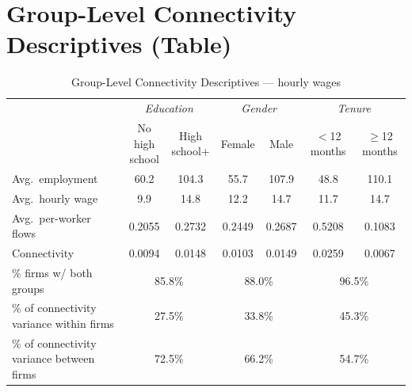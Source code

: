\documentclass[11pt]{article}
\begin{document}
\section{Group-Level Connectivity Descriptives (Table)}
\begin{table}[H]
  \centering
  \caption{Group-Level Connectivity Descriptives --- hourly wages}
  \footnotesize
  \begin{tabular}{lcccccc}
    \toprule\toprule
     & \multicolumn{2}{c}{\textit{Education}} & \multicolumn{2}{c}{\textit{Gender}} & \multicolumn{2}{c}{\textit{Tenure}} \\
    \cmidrule(lr){2-3} \cmidrule(lr){4-5} \cmidrule(lr){6-7}
     & \shortstack{No high\\school} & \shortstack{High\\school+} & Female & Male
     & \shortstack{$<$12\\months} & \shortstack{$\geq$12\\months} \\
    \midrule
    \quad Avg.\ employment & 60.2 & 104.3 & 55.7 & 107.9 & 48.8 & 110.1 \\
    \quad Avg.\ hourly wage & 9.9 & 14.8 & 12.2 & 14.7 & 11.7 & 14.7 \\
    \quad Avg.\ per-worker flows & 0.2055 & 0.2732 & 0.2449 & 0.2687 & 0.5208 & 0.1083 \\
    \quad Connectivity & 0.0094 & 0.0148 & 0.0103 & 0.0149 & 0.0259 & 0.0067 \\
    \midrule
    \quad \% firms w/ both groups & \multicolumn{2}{c}{85.8\%} & \multicolumn{2}{c}{88.0\%} & \multicolumn{2}{c}{96.5\%} \\
    \quad \% of connectivity variance within firms & \multicolumn{2}{c}{27.5\%} & \multicolumn{2}{c}{33.8\%} & \multicolumn{2}{c}{45.3\%} \\
    \quad \% of connectivity variance between firms & \multicolumn{2}{c}{72.5\%} & \multicolumn{2}{c}{66.2\%} & \multicolumn{2}{c}{54.7\%} \\
    \bottomrule\bottomrule
  \end{tabular}
  \begin{minipage}{\linewidth}
    \scriptsize\vspace{4pt}

\end{minipage}
\end{table}
\end{document}
